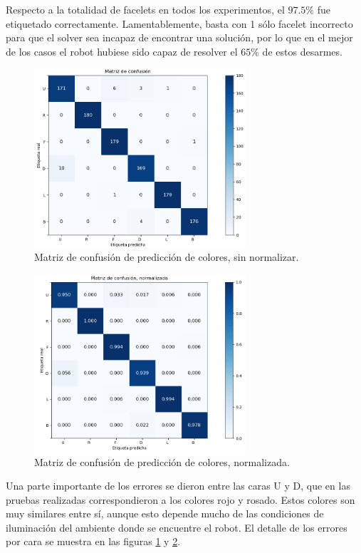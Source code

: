 Respecto a la totalidad de facelets en todos los experimentos, el $97.5$\% fue etiquetado correctamente. Lamentablemente, basta con 1 sólo facelet incorrecto para que el solver sea incapaz de encontrar una solución, por lo que en el mejor de los casos el robot hubiese sido capaz de resolver el $65$\% de estos desarmes.

\begin{figure}[h!]
	\centering
	\includegraphics[width=0.7\textwidth]{figures/conf_matrix}
	\caption{Matriz de confusión de predicción de colores, sin normalizar.}
	\label{confusion}
\end{figure}
\begin{figure}[h!]
	\centering
	\includegraphics[width=0.7\textwidth]{figures/conf_matrix_norm}
	\caption{Matriz de confusión de predicción de colores, normalizada.}
	\label{confusionnorm}
\end{figure}

Una parte importante de los errores se dieron entre las caras U y D, que en las pruebas realizadas correspondieron a los colores rojo y rosado. Estos colores son muy similares entre sí, aunque esto depende mucho de las condiciones de iluminación del ambiente donde se encuentre el robot. El detalle de los errores por cara se muestra en las figuras \ref{confusion} y \ref{confusionnorm}.



